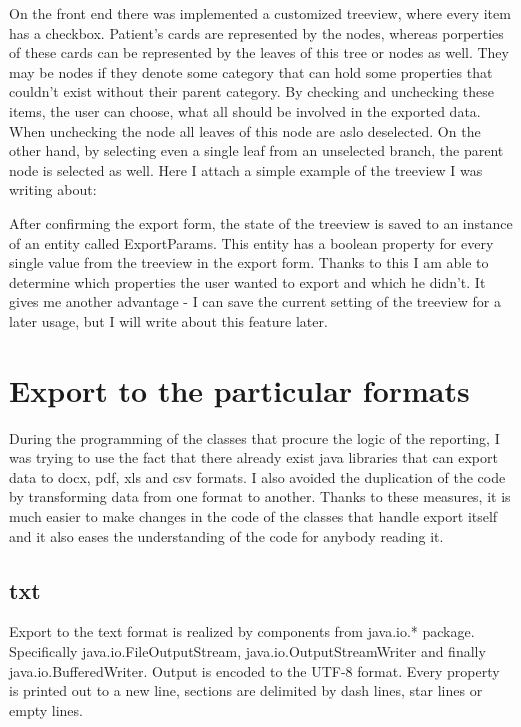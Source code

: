 \documentclass[thesis=B,english]{FITthesis}[2012/10/20]
\begin{document}
On the front end there was implemented a customized treeview, where every item has a checkbox. Patient's cards are represented by the nodes, whereas porperties of these cards can be represented by the leaves of this tree or nodes as well. They may be nodes if they denote some category that can hold some properties that couldn't exist without their parent category. By checking and unchecking these items, the user can choose, what all should be involved in the exported data. When unchecking the node all leaves of this node are aslo deselected. On the other hand, by selecting even a single leaf from an unselected branch, the parent node is selected as well.
Here I attach a simple example of the treeview I was writing about:



After confirming the export form, the state of the treeview is saved to an instance of an entity called ExportParams. This entity has a boolean property for every single value from the treeview in the export form. Thanks to this I am able to determine which properties the user wanted to export and which he didn't. It gives me another advantage - I can save the current setting of the treeview for a later usage, but I will write about this feature later.

\section{Export to the particular formats}
During the  programming of the classes that procure the logic of the reporting, I was trying to use the fact that there already exist java libraries that can export data to docx, pdf, xls and csv formats. I also avoided the duplication of the code by transforming data from one format to another. Thanks to these measures, it is much easier to make changes in the code of the classes that handle export itself and it also eases the understanding of the code for anybody reading it.
\subsection{txt}
Export to the text format is realized by components from java.io.* package. Specifically java.io.FileOutputStream, java.io.OutputStreamWriter and finally java.io.BufferedWriter. Output is encoded to the UTF-8 format. Every property is printed out to a new line, sections are delimited by dash lines, star lines or empty lines.
\end{document}
